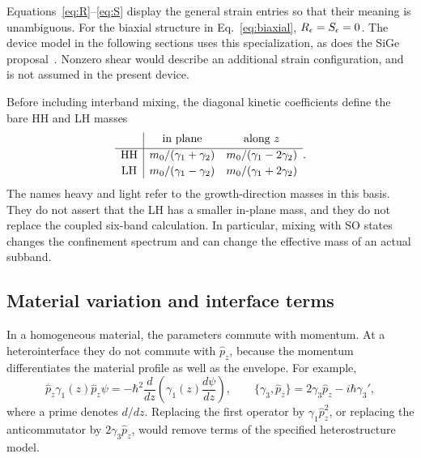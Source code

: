 Equations~\eqref{eq:R}--\eqref{eq:S} display the general strain entries so that their meaning is unambiguous. For the biaxial structure in Eq.~\eqref{eq:biaxial}, $R_\epsilon=S_\epsilon=0$. The device model in the following sections uses this specialization, as does the SiGe proposal~\cite{valvo,delvecchio2026}. Nonzero shear would describe an additional strain configuration, and is not assumed in the present device.

Before including interband mixing, the diagonal kinetic coefficients define the bare HH and LH masses
\begin{equation}
\begin{array}{c|cc}
&\text{in plane}&\text{along }z\\[2pt]\hline
\mathrm{HH}&m_0/(\gamma_1+\gamma_2)&m_0/(\gamma_1-2\gamma_2)\\[2pt]
\mathrm{LH}&m_0/(\gamma_1-\gamma_2)&m_0/(\gamma_1+2\gamma_2)
\end{array}.
\label{eq:masses}
\end{equation}
The names heavy and light refer to the growth-direction masses in this basis. They do not assert that the LH has a smaller in-plane mass, and they do not replace the coupled six-band calculation. In particular, mixing with SO states changes the confinement spectrum and can change the effective mass of an actual subband.

\subsection{Material variation and interface terms}

In a homogeneous material, the parameters commute with momentum. At a heterointerface they do not commute with $ \hat{p}_ z$, because the momentum differentiates the material profile as well as the envelope. For example,
\begin{equation}
 \hat{p}_ z\gamma_1(z) \hat{p}_ z\psi
=-\hbar^2\frac{d}{dz}\left(\gamma_1(z)\frac{d\psi}{dz}\right),
\qquad
\{\gamma_3, \hat{p}_ z\}=2\gamma_3 \hat{p}_ z-i\hbar\gamma_3',
\label{eq:ordering}
\end{equation}
where a prime denotes $d/dz$. Replacing the first operator by $\gamma_1 \hat{p}_ z^2$, or replacing the anticommutator by $2\gamma_3 \hat{p}_ z$, would remove terms of the specified heterostructure model.

